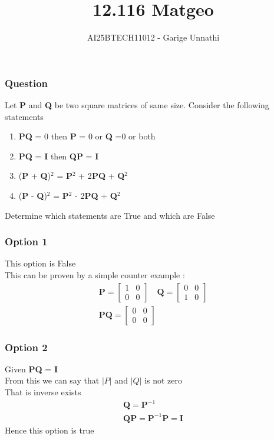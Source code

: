 \documentclass{beamer}
\title{12.116 Matgeo}
\author{AI25BTECH11012 - Garige Unnathi}
\date{}
\begin{document}
\frame{\titlepage}

\begin{frame}
\frametitle{Question}
Let \textbf{P} and \textbf{Q} be two square matrices of same size. Consider the following statements
\begin{enumerate}
    \item \textbf{P}\textbf{Q} = 0 then \textbf{P} = 0 or \textbf{Q} =0 or both
    \item \textbf{P}\textbf{Q} = \textbf{I} then \textbf{Q}\textbf{P} = \textbf{I}
    \item (\textbf{P} + \textbf{Q})$^2$ = \textbf{P}$^2$ + 2\textbf{P}\textbf{Q} + \textbf{Q}$^2$
    \item (\textbf{P} - \textbf{Q})$^2$ = \textbf{P}$^2$ - 2\textbf{P}\textbf{Q} + \textbf{Q}$^2$
\end{enumerate}
Determine which statements are True and which are False
\end{frame}


\begin{frame}
\frametitle{Option 1}
This option is False\\
    This can be proven by a simple counter example :\\
    \begin{align}
        \textbf{P} = \begin{bmatrix}1&0\\0&0\end{bmatrix} \quad
        \textbf{Q} = \begin{bmatrix}0&0\\1&0\end{bmatrix}\\
        \textbf{P}\textbf{Q} = \begin{bmatrix}0&0\\0&0\end{bmatrix}
    \end{align}
\end{frame}



\begin{frame}
\frametitle{Option 2}
Given \textbf{P}\textbf{Q} = \textbf{I} \\
     From this we can say that $\lvert P \rvert$ and $\lvert Q \rvert$ is not zero \\
     That is inverse exists
     \begin{align}
         \textbf{Q} = \textbf{P}^{-1}\\
         \textbf{Q}\textbf{P} = \textbf{P}^{-1}\textbf{P} = \textbf{I}
     \end{align}
     Hence this option is true 


\end{frame}
\end{document}
